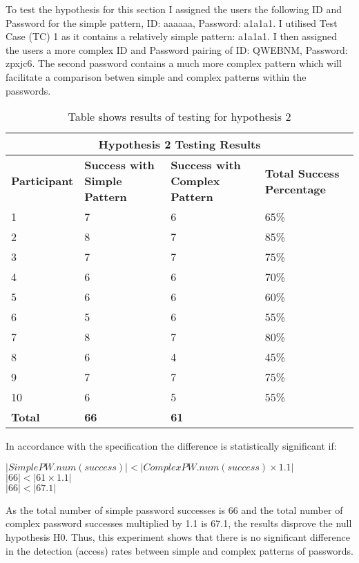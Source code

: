 \documentclass{article}
\begin{document}
To test the hypothesis for this section I assigned the users the following ID and Password for the simple pattern, ID: aaaaaa, Password: a1a1a1. I utilised Test Case (TC) 1 as it contains a relatively simple pattern: a1a1a1. I then assigned the users a more complex ID and Password pairing of ID: QWEBNM, Password: zpxjc6. The second password contains a much more complex pattern which will facilitate a comparison betwen simple and complex patterns within the passwords. 

{
\begin{table} [H]
\centering
\begin{tabular}{ |p{2cm}|p{4cm}|p{4cm}| p{4cm} | }
\hline
\multicolumn{4}{|c|}{\textbf{Hypothesis 2 Testing Results}} \\
\hline
\textbf{Participant} & \textbf{Success with Simple Pattern} & \textbf{Success with Complex Pattern} & \textbf{Total Success Percentage} \\
\hline
1 & 7 & 6 & 65\% \\
\hline
2 & 8 & 7 & 85\% \\
\hline
3 & 7 & 7 & 75\% \\
\hline
4 & 6 & 6 & 70\%  \\
\hline
5 & 6 & 6 & 60\% \\
\hline
6 & 5 & 6 & 55\% \\
\hline
7 & 8 & 7 & 80\% \\
\hline
8 & 6 & 4 & 45\% \\
\hline
9 & 7 & 7 & 75\% \\
\hline
10 & 6 & 5 & 55\% \\
\hline
\textbf{Total} & \textbf{66} & \textbf{61} & \\
\hline
\end{tabular}
\caption{Table shows results of testing for hypothesis 2}
\label{table:2}
\end{table}
}

In accordance with the specification the difference is statistically significant if: 
\begin{center}
    $ |SimplePW.num(success)| < |ComplexPW.num(success) \times 1.1|$ \\
    $ |66| < |61 \times 1.1| $ \\
    $ |66| < |67.1| $
\end{center}

As the total number of simple password successes is 66 and the total number of complex password successes multiplied by 1.1 is 67.1, the results disprove the null hypothesis H0. Thus, this experiment shows that there is no significant difference in the detection (access) rates between simple and complex patterns of passwords. 
\end{document}
